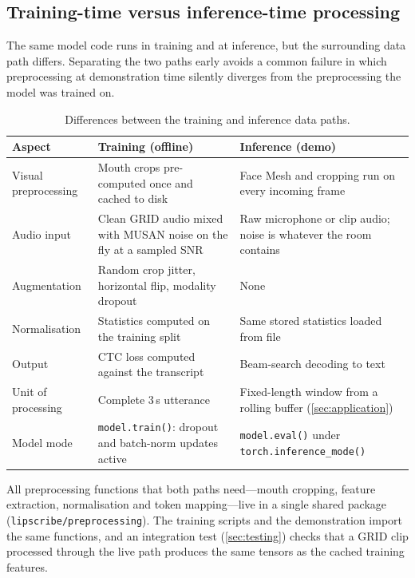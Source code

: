 \subsection{Training-time versus inference-time processing}
The same model code runs in training and at inference, but the surrounding
data path differs. Separating the two paths early avoids a common failure in
which preprocessing at demonstration time silently diverges from the
preprocessing the model was trained on.

\begin{table}[H]
\centering
\caption{Differences between the training and inference data paths.}
\label{tab:train-vs-infer}
\small
\begin{tabularx}{\textwidth}{@{}p{3.2cm}XX@{}}
\toprule
\textbf{Aspect} & \textbf{Training (offline)} & \textbf{Inference (demo)} \\
\midrule
Visual preprocessing & Mouth crops pre-computed once and cached to disk &
Face Mesh and cropping run on every incoming frame \\
Audio input & Clean GRID audio mixed with MUSAN noise on the fly at a sampled SNR &
Raw microphone or clip audio; noise is whatever the room contains \\
Augmentation & Random crop jitter, horizontal flip, modality dropout &
None \\
Normalisation & Statistics computed on the training split & Same stored
statistics loaded from file \\
Output & CTC loss computed against the transcript & Beam-search decoding to text \\
Unit of processing & Complete 3\,s utterance & Fixed-length window from a
rolling buffer (\cref{sec:application}) \\
Model mode & \texttt{model.train()}: dropout and batch-norm updates active &
\texttt{model.eval()} under \texttt{torch.inference\_mode()} \\
\bottomrule
\end{tabularx}
\end{table}

All preprocessing functions that both paths need---mouth cropping, feature
extraction, normalisation and token mapping---live in a single shared package
(\texttt{lipscribe/preprocessing}). The training scripts and the demonstration
import the same functions, and an integration test (\cref{sec:testing})
checks that a GRID clip processed through the live path produces the same
tensors as the cached training features.
